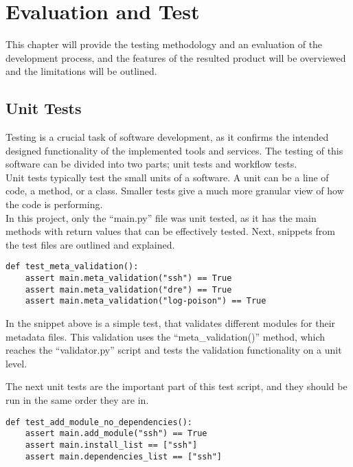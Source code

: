 \chapter{Evaluation and Test}
This chapter will provide the testing methodology and an evaluation of the development process, and the features of the resulted product will be overviewed and the limitations will be outlined.\\

\section{Unit Tests}
Testing is a crucial task of software development, as it confirms the intended designed functionality of the implemented tools and services.
The testing of this software can be divided into two parts; unit tests and workflow tests.\\
Unit tests typically test the small units of a software. A unit can be a line of code, a method, or a class. Smaller tests give a much more granular view of how the code is performing\cite{unittests}.\\

In this project, only the “main.py” file was unit tested, as it has the main methods with return values that can be effectively tested. Next, snippets from the test files are outlined and explained.\\

\begin{lstlisting}[caption=Validation unittest, style=pythonstyle]
def test_meta_validation():
    assert main.meta_validation("ssh") == True
    assert main.meta_validation("dre") == True
    assert main.meta_validation("log-poison") == True
\end{lstlisting}

In the snippet above is a simple test, that validates different modules for their metadata files. This validation uses the “meta\_validation()” method, which reaches the “validator.py” script and tests the validation functionality on a unit level.\\
\clearpage

The next unit tests are the important part of this test script, and they should be run in the same order they are in.\\

\begin{lstlisting}[caption=test\_add\_module\_no\_dependencies, style=pythonstyle]
def test_add_module_no_dependencies():
    assert main.add_module("ssh") == True
    assert main.install_list == ["ssh"]
    assert main.dependencies_list == ["ssh"]
\end{lstlisting}

